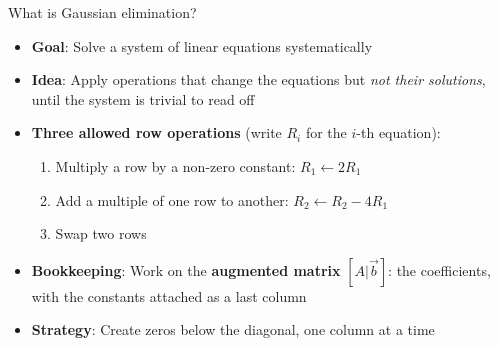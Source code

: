 \ifdefined\PRESENTATION\else\PassOptionsToClass{handout}{beamer}\fi\documentclass[aspectratio=169, lualatex]{beamer}
\begin{document}
\begin{frame}{What is Gaussian elimination?}
	\begin{itemize}
		\item \textbf{Goal}: Solve a system of linear equations systematically
		\item \textbf{Idea}: Apply operations that change the equations but \textit{not their solutions}, until the system is trivial to read off
		\item \textbf{Three allowed row operations} (write $R_i$ for the $i$-th equation):
		      \begin{enumerate}
			      \item Multiply a row by a non-zero constant: $R_1 \leftarrow 2R_1$
			      \item Add a multiple of one row to another: $R_2 \leftarrow R_2 - 4R_1$
			      \item Swap two rows
		      \end{enumerate}
		\item \textbf{Bookkeeping}: Work on the \textbf{augmented matrix} $[A|\vec{b}]$: the coefficients, with the constants attached as a last column
		\item \textbf{Strategy}: Create zeros below the diagonal, one column at a time
	\end{itemize}
\end{frame}
\end{document}
